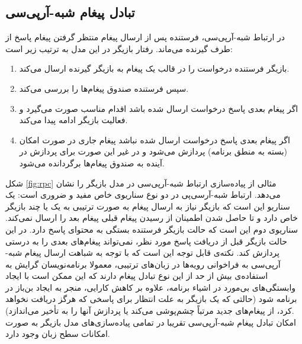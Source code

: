 \subsection{تبادل پیغام شبه-آرپی‌سی}
در ارتباط شبه‌-آرپی‌سی، فرستنده‌ پس از ارسال پیغام منتظر گرفتن پیغام پاسخ از طرف گیرنده می‌ماند. رفتار بازیگر در این مدل به ترتیب زیر است:
\begin{enumerate}
\item بازیگر فرستنده درخواست را در قالب یک پیغام به بازیگر گیرنده ارسال می‌کند.
\item سپس فرستنده صندوق پیغام‌ها را بررسی می‌کند.   
\item اگر پیغام بعدی پاسخ درخواست ارسال شده باشد اقدام مناسب صورت می‌گیرد و فعالیت بازیگر ادامه پیدا می‌کند.
\item اگر پیغام بعدی پاسخ درخواست ارسال شده نباشد پیغام جاری در صورت امکان (بسته به منطق برنامه) پردازش می‌شود و در غیر این صورت برای پردازش در آینده به صندوق پیغام‌ها برگردانده می‌شود.
\end{enumerate}
شکل \ref{fig:rpc} مثالی از  پیاده‌سازی ارتباط شبه-آرپی‌سی در مدل بازیگر را نشان می‌دهد. ارتباط شبه-آرسی‌پی در دو نوع سناریوی خاص مفید و ضروری است: یک سناریو این است که بازیگر نیاز به ارسال پیغام به صورت ترتیبی به یک یا چند بازیگر خاص دارد و تا حاصل شدن اطمینان از رسیدن پیغام قبلی پیغام بعد را ارسال نمی‌کند. سناریوی دوم این است که حالت بازیگر فرستنده بستگی به محتوای پاسخ دارد. در این حالت بازیگر قبل از دریافت پاسخ مورد نظر، نمی‌تواند پیغام‌های بعدی را به درستی پردازش کند. نکته‌ی قابل توجه این است که با توجه به شباهت ارسال پیغام شبه-آرپی‌سی به فراخوانی رویه‌ها در زبان‌های \gls{ترتیبی}، معمولا برنامه‌نویسان گرایش به استفاده‌ی بیش از حد از این نوع تبادل پیغام دارند که این ممکن است با ایجاد وابستگی‌های بی‌مورد در اشیاء برنامه، علاوه بر کاهش کارایی، منجر به ایجاد \gls{بن‌باز} در برنامه شود (حالتی که یک بازیگر به علت انتظار برای پاسخی که هرگز دریافت نخواهد کرد، از پیغام‌های جدید مرتباً چشم‌پوشی می‌کند یا پردازش آنها را به تأخیر می‌اندازد).\\
امکان تبادل پیغام شبه-آرپی‌سی تقریبا در تمامی پیاده‌سازی‌های مدل بازیگر به صورت امکانات سطح زبان وجود دارد\cite{ActorsJVM2009}.


